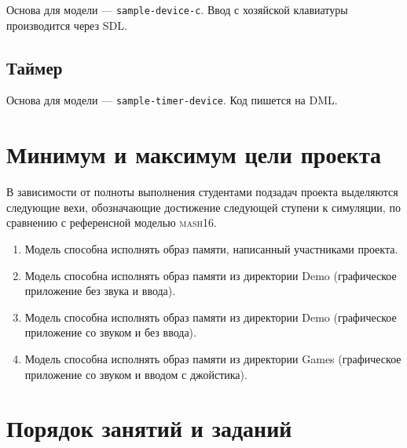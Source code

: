 Основа для модели --- \texttt{sample-device-c}. Ввод с хозяйской клавиатуры производится через SDL.

\subsection{Таймер}

Основа для модели --- \texttt{sample-timer-device}. Код пишется на DML.

\section{Минимум и максимум цели проекта}

В зависимости от полноты выполнения студентами подзадач проекта выделяются следующие вехи, обозначающие достижение следующей ступени к симуляции, по сравнению с референсной моделью \textsc{mash16}.

\begin{enumerate}
    \item Модель способна исполнять образ памяти, написанный участниками проекта.
    \item Модель способна исполнять образ памяти из директории Demo (графическое приложение без звука и ввода).
    \item Модель способна исполнять образ памяти из директории Demo (графическое приложение со звуком и без ввода).
    \item Модель способна исполнять образ памяти из директории Games (графическое приложение со звуком и вводом с джойстика).
\end{enumerate}

\section{Порядок занятий и заданий}

